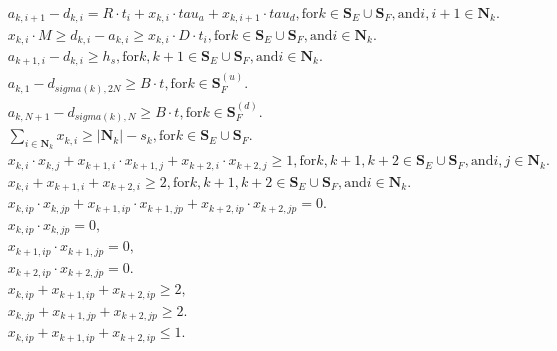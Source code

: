 \begin{align}
  & a_{k , i + 1} - d_{k , i} = R \cdot t_{i} + x_{k , i} \cdot \mathit{tau}_{a} + x_{k , i + 1} \cdot \mathit{tau}_{d} , \text{for} k \in \mathbf{S}_{E} \cup \mathbf{S}_{F} , \text{and} i , i + 1 \in \mathbf{N}_{k} . \tag{eq\_0005} \\
  & x_{k , i} \cdot M \geq d_{k , i} - a_{k , i} \geq x_{k , i} \cdot D \cdot t_{i} , \text{for} k \in \mathbf{S}_{E} \cup \mathbf{S}_{F} , \text{and} i \in \mathbf{N}_{k} . \tag{eq\_0007} \\
  & a_{k + 1 , i} - d_{k , i} \geq h_{s} , \text{for} k , k + 1 \in \mathbf{S}_{E} \cup \mathbf{S}_{F} , \text{and} i \in \mathbf{N}_{k} . \tag{eq\_0008} \\
  & a_{k , 1} - d_{\mathit{sigma} \left(k\right) , 2 N} \geq B \cdot t , \text{for} k \in \mathbf{S}_{F}^{\left(u\right)} . \tag{eq\_0009} \\
  & a_{k , N + 1} - d_{\mathit{sigma} \left(k\right) , N} \geq B \cdot t , \text{for} k \in \mathbf{S}_{F}^{\left(d\right)} . \tag{eq\_0010} \\
  & \sum_{i \in \mathbf{N}_{k}} x_{k , i} \geq \left|\mathbf{N}_{k}\right| - s_{k} , \text{for} k \in \mathbf{S}_{E} \cup \mathbf{S}_{F} . \tag{eq\_0011} \\
  & x_{k , i} \cdot x_{k , j} + x_{k + 1 , i} \cdot x_{k + 1 , j} + x_{k + 2 , i} \cdot x_{k + 2 , j} \geq 1 , \text{for} k , k + 1 , k + 2 \in \mathbf{S}_{E} \cup \mathbf{S}_{F} , \text{and} i , j \in \mathbf{N}_{k} . \tag{eq\_0012} \\
  & x_{k , i} + x_{k + 1 , i} + x_{k + 2 , i} \geq 2 , \text{for} k , k + 1 , k + 2 \in \mathbf{S}_{E} \cup \mathbf{S}_{F} , \text{and} i \in \mathbf{N}_{k} . \tag{eq\_0013} \\
  & x_{k , ip} \cdot x_{k , jp} + x_{k + 1 , ip} \cdot x_{k + 1 , jp} + x_{k + 2 , ip} \cdot x_{k + 2 , jp} = 0 . \tag{eq\_0014} \\
  &  x_{k , ip} \cdot x_{k , jp} = 0 ,  \tag{eq\_0015} \\
  &  x_{k + 1 , ip} \cdot x_{k + 1 , jp} = 0 ,  \tag{eq\_0016} \\
  &  x_{k + 2 , ip} \cdot x_{k + 2 , jp} = 0 .  \tag{eq\_0017} \\
  &  x_{k , ip} + x_{k + 1 , ip} + x_{k + 2 , ip} \geq 2 ,  \tag{eq\_0018} \\
  &  x_{k , jp} + x_{k + 1 , jp} + x_{k + 2 , jp} \geq 2 .  \tag{eq\_0019} \\
  & x_{k , ip} + x_{k + 1 , ip} + x_{k + 2 , ip} \leq 1 . \tag{eq\_0020} \\

\end{align}
